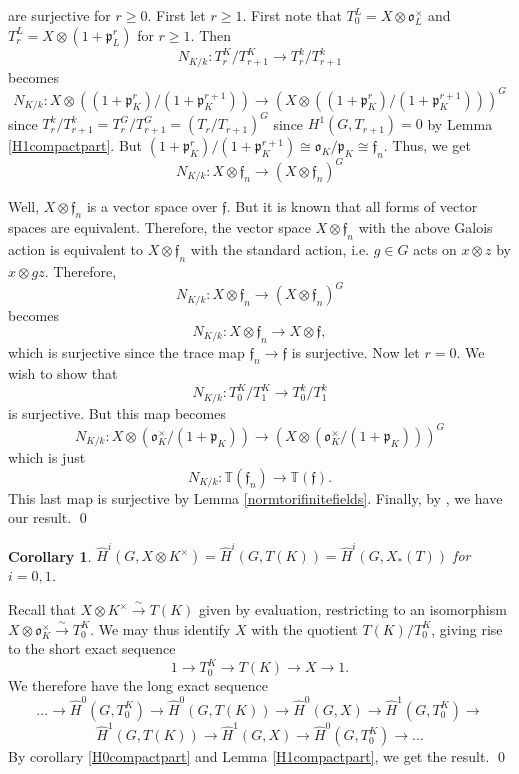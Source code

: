 \documentclass[11pt]{amsart}
\theoremstyle{plain}
\newtheorem{corollary}[theorem]{Corollary}
\theoremstyle{definition}
\begin{document}
are surjective for $r \geq 0$.  First let $r \geq 1$.  First note that
$T_0^L = X \otimes \mathfrak{o}_L^\times$ and
$T_r^L = X \otimes (1 + \mathfrak{p}_L^r)$ for $r \geq 1$.  Then
$$N_{K/k} : T_r^K / T_{r+1}^K \rightarrow T_r^k / T_{r+1}^k$$
becomes
$$N_{K/k} : X \otimes \left( (1 + \mathfrak{p}_K^r) / (1 +
  \mathfrak{p}_K^{r+1}) \right) \rightarrow (X \otimes \left( (1 +
  \mathfrak{p}_K^r) / (1 + \mathfrak{p}_K^{r+1}) \right) )^G$$
since $T_r^k / T_{r+1}^k = T_r^G / T_{r+1}^G = (T_r / T_{r+1})^G$ since
$H^1(G, T_{r+1}) = 0$ by Lemma \ref{H1compactpart}.  But
$(1 + \mathfrak{p}_K^r) / (1 + \mathfrak{p}_K^{r+1}) \cong \mathfrak{o}_K / \mathfrak{p}_K \cong \mathfrak{f}_n$.
Thus, we get
$$N_{K/k} : X \otimes \mathfrak{f}_n \rightarrow (X \otimes \mathfrak{f}_n)^G$$

Well, $X \otimes \mathfrak{f}_n$ is a vector space over
$\mathfrak{f}$.  But it is known that all forms of vector spaces are
equivalent.  Therefore, the vector space $X \otimes \mathfrak{f}_n$
with the above Galois action is equivalent to $X \otimes \mathfrak{f}_n$
with the standard action, i.e. $g \in G$ acts on $x \otimes z$ by
$x \otimes gz$.  Therefore,
$$N_{K/k} : X \otimes \mathfrak{f}_n \rightarrow (X \otimes \mathfrak{f}_n)^G$$
becomes
$$N_{K/k} : X \otimes \mathfrak{f}_n \rightarrow X \otimes \mathfrak{f},$$
which is surjective since the trace map $\mathfrak{f}_n \rightarrow \mathfrak{f}$
is surjective.  Now let $r = 0$.  We wish to show that
$$N_{K/k} : T_0^K / T_1^K \rightarrow T_0^k / T_1^k$$
is surjective.  But this map becomes
$$N_{K/k} : X \otimes \left( \mathfrak{o}_K^\times / (1 + \mathfrak{p}_K) \right) \rightarrow (X \otimes \left( \mathfrak{o}_K^\times / (1 + \mathfrak{p}_K) \right) )^G$$
which is just
$$N_{K/k} : \mathbb{T}(\mathfrak{f}_n) \rightarrow \mathbb{T}(\mathfrak{f}).$$
This last map is surjective by Lemma \ref{normtorifinitefields}.
Finally, by \cite[Lemma 2, p. 81]{serre1}, we have our result.
\qed

\begin{corollary}\label{reductiontori}
$\hat{H}^i(G, X \otimes K^\times) = \hat{H}^i(G, T(K)) = \hat{H}^i(G,X_*(T))$ for $i=0,1$.
\end{corollary}

\proof

Recall that $X \otimes K^\times \xrightarrow{\sim} T(K)$ given by
evaluation, restricting to an isomorphism $X \otimes \mathfrak{o}_K^\times
\xrightarrow{\sim} T_0^K$.  We may thus identify $X$ with the quotient
$T(K) / T_0^K$, giving rise to the short exact sequence
$$1 \rightarrow T_0^K \rightarrow T(K) \rightarrow X \rightarrow 1.$$
We therefore have the long exact sequence
$$... \rightarrow \hat{H}^0(G, T_0^K) \rightarrow \hat{H}^0(G, T(K)) \rightarrow \hat{H}^0(G, X)
\rightarrow \hat{H}^1(G, T_0^K) \rightarrow $$ $$\hat{H}^1(G, T(K))
\rightarrow \hat{H}^1(G, X) \rightarrow \hat{H}^0(G, T_0^K)
\rightarrow ...$$
By corollary \ref{H0compactpart} and Lemma \ref{H1compactpart}, we get the result.
\qed
\end{document}
